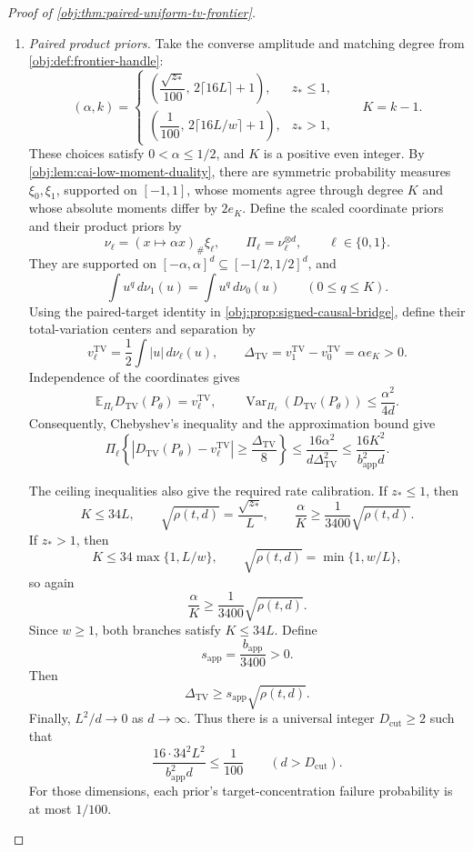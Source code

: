 \documentclass[11pt]{article}
\begin{document}
\begin{proof}[Proof of \cref{obj:thm:paired-uniform-tv-frontier}]
\begin{enumerate}
\item \textit{Paired product priors.}
Take the converse amplitude and matching degree from \cref{obj:def:frontier-handle}:
\[
(\alpha,k)=
\begin{cases}
\left(\dfrac{\sqrt{z_*}}{100},\,2\lceil16L\rceil+1\right),&z_*\le1,\\[4pt]
\left(\dfrac1{100},\,2\lceil16L/w\rceil+1\right),&z_*>1,
\end{cases}
\qquad K=k-1.
\]
These choices satisfy \(0<\alpha\le1/2\), and \(K\) is a positive even integer.
By \cref{obj:lem:cai-low-moment-duality}, there are symmetric probability measures \(\xi_0,\xi_1\), supported on \([-1,1]\), whose moments agree through degree \(K\) and whose absolute moments differ by \(2e_K\). Define the scaled coordinate priors and their product priors by
\[
\nu_\ell=(x\mapsto\alpha x)_\#\xi_\ell,
\qquad
\Pi_\ell=\nu_\ell^{\otimes d},
\qquad \ell\in\{0,1\}.
\]
They are supported on \([-\alpha,\alpha]^d\subseteq[-1/2,1/2]^d\), and
\[
\int u^q\,d\nu_1(u)=\int u^q\,d\nu_0(u)
\qquad(0\le q\le K).
\]
Using the paired-target identity in \cref{obj:prop:signed-causal-bridge}, define their total-variation centers and separation by
\[
v_\ell^{\mathrm{TV}}=\frac12\int |u|\,d\nu_\ell(u),
\qquad
\Delta_{\mathrm{TV}}
=v_1^{\mathrm{TV}}-v_0^{\mathrm{TV}}
=\alpha e_K>0.
\]
Independence of the coordinates gives
\[
\mathbb E_{\Pi_\ell}D_{\mathrm{TV}}(P_\theta)=v_\ell^{\mathrm{TV}},
\qquad
\operatorname{Var}_{\Pi_\ell}\!\left(D_{\mathrm{TV}}(P_\theta)\right)
\le\frac{\alpha^2}{4d}.
\]
Consequently, Chebyshev's inequality and the approximation bound give
\[
\Pi_\ell\left\{
\left|D_{\mathrm{TV}}(P_\theta)-v_\ell^{\mathrm{TV}}\right|
\ge\frac{\Delta_{\mathrm{TV}}}{8}
\right\}
\le
\frac{16\alpha^2}{d\Delta_{\mathrm{TV}}^2}
\le\frac{16K^2}{b_{\mathrm{app}}^2d}.
\]

The ceiling inequalities also give the required rate calibration. If \(z_*\le1\), then
\[
K\le34L,\qquad
\sqrt{\rho(t,d)}=\frac{\sqrt{z_*}}{L},
\qquad
\frac{\alpha}{K}\ge\frac1{3400}\sqrt{\rho(t,d)}.
\]
If \(z_*>1\), then
\[
K\le34\max\{1,L/w\},
\qquad
\sqrt{\rho(t,d)}=\min\{1,w/L\},
\]
so again
\[
\frac{\alpha}{K}\ge\frac1{3400}\sqrt{\rho(t,d)}.
\]
Since \(w\ge1\), both branches satisfy \(K\le34L\). Define
\[
s_{\mathrm{app}}=\frac{b_{\mathrm{app}}}{3400}>0.
\]
Then
\[
\Delta_{\mathrm{TV}}\ge s_{\mathrm{app}}\sqrt{\rho(t,d)}.
\]
Finally, \(L^2/d\to0\) as \(d\to\infty\). Thus there is a universal integer \(D_{\mathrm{cut}}\ge2\) such that
\[
\frac{16\cdot34^2L^2}{b_{\mathrm{app}}^2d}\le\frac1{100}
\qquad(d>D_{\mathrm{cut}}).
\]
For those dimensions, each prior's target-concentration failure probability is at most \(1/100\).


\end{enumerate}
\end{proof}
\end{document}

